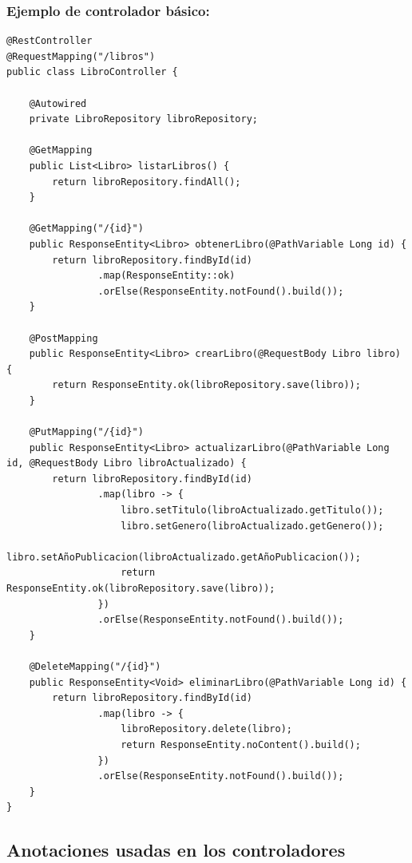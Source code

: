 \documentclass[11pt]{article}
\begin{document}
\subsubsection{Ejemplo de controlador básico:}
\label{sec:orga19c866}
\begin{verbatim}
@RestController
@RequestMapping("/libros")
public class LibroController {

    @Autowired
    private LibroRepository libroRepository;

    @GetMapping
    public List<Libro> listarLibros() {
        return libroRepository.findAll();
    }

    @GetMapping("/{id}")
    public ResponseEntity<Libro> obtenerLibro(@PathVariable Long id) {
        return libroRepository.findById(id)
                .map(ResponseEntity::ok)
                .orElse(ResponseEntity.notFound().build());
    }

    @PostMapping
    public ResponseEntity<Libro> crearLibro(@RequestBody Libro libro) {
        return ResponseEntity.ok(libroRepository.save(libro));
    }

    @PutMapping("/{id}")
    public ResponseEntity<Libro> actualizarLibro(@PathVariable Long id, @RequestBody Libro libroActualizado) {
        return libroRepository.findById(id)
                .map(libro -> {
                    libro.setTitulo(libroActualizado.getTitulo());
                    libro.setGenero(libroActualizado.getGenero());
                    libro.setAñoPublicacion(libroActualizado.getAñoPublicacion());
                    return ResponseEntity.ok(libroRepository.save(libro));
                })
                .orElse(ResponseEntity.notFound().build());
    }

    @DeleteMapping("/{id}")
    public ResponseEntity<Void> eliminarLibro(@PathVariable Long id) {
        return libroRepository.findById(id)
                .map(libro -> {
                    libroRepository.delete(libro);
                    return ResponseEntity.noContent().build();
                })
                .orElse(ResponseEntity.notFound().build());
    }
}
\end{verbatim}

\subsection{Anotaciones usadas en los controladores}
\label{sec:org454fa60}
\end{document}

